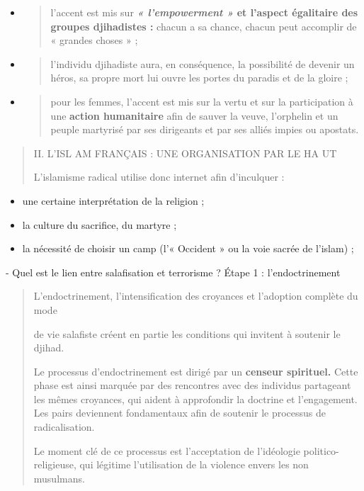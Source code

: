 \begin{itemize}
\item
  \begin{quote}
  l'accent est mis sur \textbf{\emph{« l'empowerment »} et l'aspect
  égalitaire des groupes djihadistes :} chacun a sa chance, chacun peut
  accomplir de « grandes choses » ;
  \end{quote}
\item
  \begin{quote}
  l'individu djihadiste aura, en conséquence, la possibilité de devenir
  un héros, sa propre mort lui ouvre les portes du paradis et de la
  gloire ;
  \end{quote}
\item
  \begin{quote}
  pour les femmes, l'accent est mis sur la vertu et sur la participation
  à une \textbf{action humanitaire} afin de sauver la veuve, l'orphelin
  et un peuple martyrisé par ses dirigeants et par ses alliés impies ou
  apostats.
  \end{quote}
\end{itemize}

\begin{quote}
II. L'ISL AM FRANÇAIS : UNE ORGANISATION PAR LE HA UT

L'islamisme radical utilise donc internet afin d'inculquer :
\end{quote}

\begin{itemize}
\item
  une certaine interprétation de la religion ;
\item
  la culture du sacrifice, du martyre ;
\item
  la nécessité de choisir un camp (l'« Occident » ou la voie sacrée de
  l'islam) ;
\end{itemize}

- Quel est le lien entre salafisation et terrorisme ? Étape 1 :
l'endoctrinement

\begin{quote}
L'endoctrinement, l'intensification des croyances et l'adoption complète
du mode

de vie salafiste créent en partie les conditions qui invitent à soutenir
le djihad.

Le processus d'endoctrinement est dirigé par un \textbf{censeur
spirituel.} Cette phase est ainsi marquée par des rencontres avec des
individus partageant les mêmes croyances, qui aident à approfondir la
doctrine et l'engagement. Les pairs deviennent fondamentaux afin de
soutenir le processus de radicalisation.

Le moment clé de ce processus est l'acceptation de l'idéologie
politico-religieuse, qui légitime l'utilisation de la violence envers
les non musulmans.
\end{quote}

